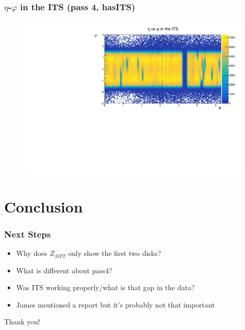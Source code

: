 \documentclass[10pt]{beamer}
\begin{document}
\begin{frame}
    \frametitle{$\eta$-$\varphi$ in the ITS (pass 4, hasITS)}
        \begin{figure}
            \begin{center}
                \includegraphics[width=\textwidth]{Plots/pass4_TracksIU/eta_phi.pdf}
            \end{center}
        \end{figure}
\end{frame}


\section{Conclusion}

\begin{frame}
    \frametitle{Next Steps}

    \begin{itemize}
        \item Why does $Z_{MFT}$ only show the first two disks?
        \item What is different about pass4?
        \item Was ITS working properly/what is that gap in the data?
        \item James mentioned a report but it's probably not that important
    \end{itemize}

\end{frame}

\begin{frame}
    \begin{center}
        {\Huge Thank you!}
    \end{center}

\end{frame}
\end{document}
